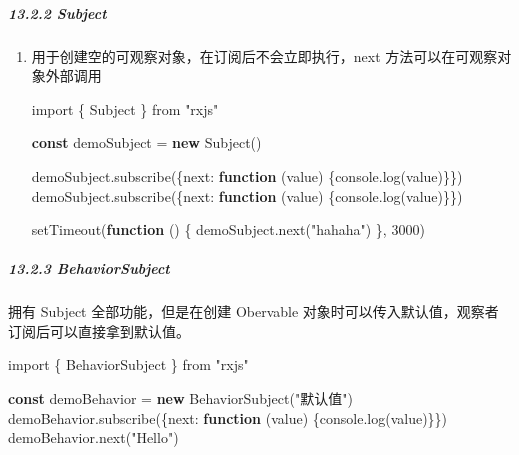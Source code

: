 \documentclass[
]{article}
\newenvironment{Shaded}{}{}
\newcommand{\BuiltInTok}[1]{#1}
\newcommand{\DataTypeTok}[1]{\textcolor[rgb]{0.56,0.13,0.00}{#1}}
\newcommand{\DecValTok}[1]{\textcolor[rgb]{0.25,0.63,0.44}{#1}}
\newcommand{\FunctionTok}[1]{\textcolor[rgb]{0.02,0.16,0.49}{#1}}
\newcommand{\ImportTok}[1]{#1}
\newcommand{\KeywordTok}[1]{\textcolor[rgb]{0.00,0.44,0.13}{\textbf{#1}}}
\newcommand{\NormalTok}[1]{#1}
\newcommand{\OperatorTok}[1]{\textcolor[rgb]{0.40,0.40,0.40}{#1}}
\newcommand{\PreprocessorTok}[1]{\textcolor[rgb]{0.74,0.48,0.00}{#1}}
\newcommand{\StringTok}[1]{\textcolor[rgb]{0.25,0.44,0.63}{#1}}
\begin{document}
\hypertarget{1322-subject}{%
\subparagraph{13.2.2 Subject}\label{1322-subject}}

\begin{enumerate}
\def\labelenumi{\arabic{enumi}.}
\item
  用于创建空的可观察对象，在订阅后不会立即执行，next
  方法可以在可观察对象外部调用

\begin{Shaded}
\begin{Highlighting}[]
\ImportTok{import}\NormalTok{ \{ Subject \} }\ImportTok{from} \StringTok{"rxjs"}

\KeywordTok{const}\NormalTok{ demoSubject }\OperatorTok{=} \KeywordTok{new} \FunctionTok{Subject}\NormalTok{()}

\NormalTok{demoSubject}\OperatorTok{.}\FunctionTok{subscribe}\NormalTok{(\{}\DataTypeTok{next}\OperatorTok{:} \KeywordTok{function}\NormalTok{ (value) \{}\BuiltInTok{console}\OperatorTok{.}\FunctionTok{log}\NormalTok{(value)\}\})}
\NormalTok{demoSubject}\OperatorTok{.}\FunctionTok{subscribe}\NormalTok{(\{}\DataTypeTok{next}\OperatorTok{:} \KeywordTok{function}\NormalTok{ (value) \{}\BuiltInTok{console}\OperatorTok{.}\FunctionTok{log}\NormalTok{(value)\}\})}

\PreprocessorTok{setTimeout}\NormalTok{(}\KeywordTok{function}\NormalTok{ () \{}
\NormalTok{  demoSubject}\OperatorTok{.}\FunctionTok{next}\NormalTok{(}\StringTok{"hahaha"}\NormalTok{)}
\NormalTok{\}}\OperatorTok{,} \DecValTok{3000}\NormalTok{)}
\end{Highlighting}
\end{Shaded}
\end{enumerate}

\hypertarget{1323-behaviorsubject}{%
\subparagraph{13.2.3 BehaviorSubject}\label{1323-behaviorsubject}}

拥有 Subject 全部功能，但是在创建 Obervable
对象时可以传入默认值，观察者订阅后可以直接拿到默认值。

\begin{Shaded}
\begin{Highlighting}[]
\ImportTok{import}\NormalTok{ \{ BehaviorSubject \} }\ImportTok{from} \StringTok{"rxjs"}

\KeywordTok{const}\NormalTok{ demoBehavior }\OperatorTok{=} \KeywordTok{new} \FunctionTok{BehaviorSubject}\NormalTok{(}\StringTok{"默认值"}\NormalTok{)}
\NormalTok{demoBehavior}\OperatorTok{.}\FunctionTok{subscribe}\NormalTok{(\{}\DataTypeTok{next}\OperatorTok{:} \KeywordTok{function}\NormalTok{ (value) \{}\BuiltInTok{console}\OperatorTok{.}\FunctionTok{log}\NormalTok{(value)\}\})}
\NormalTok{demoBehavior}\OperatorTok{.}\FunctionTok{next}\NormalTok{(}\StringTok{"Hello"}\NormalTok{)}
\end{Highlighting}
\end{Shaded}
\end{document}
